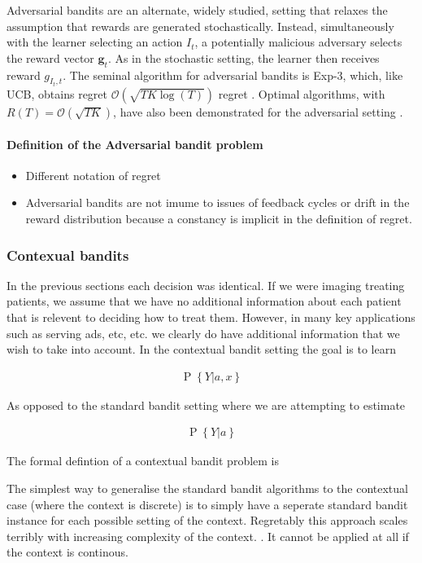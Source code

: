 \documentclass[11pt,a4paper,oneside]{book}
\newcommand{\eq}[1]{\begin{align*}#1\end{align*}}
\newcommand{\bigo}[1]{\mathcal{O}\left( #1 \right)}
\renewcommand{\P}[1]{\operatorname{P}\left\{#1\right\}}
\begin{document}
Adversarial bandits are an alternate, widely studied, setting that relaxes the assumption that rewards are generated stochastically. Instead, simultaneously with the learner selecting an action $I_t$, a potentially malicious adversary selects the reward vector $\boldsymbol{g}_t$. As in the stochastic setting, the learner then receives reward $g_{I_t,t}$. The seminal algorithm for adversarial bandits is Exp-3, which, like UCB, obtains regret $\bigo{\sqrt{TK\log(T)}}$ regret \cite{Auer1995}. Optimal algorithms, with $R(T) = \bigo{\sqrt{TK}}$, have also been demonstrated for the adversarial setting \cite{Audibert2009}.

\paragraph*{Definition of the Adversarial bandit problem}
\begin{itemize}
\item Different notation of regret
\item Adversarial bandits are not imume to issues of feedback cycles or drift in the reward distribution because a constancy is implicit in the definition of regret. 
\end{itemize}

\subsubsection*{Contexual bandits}
In the previous sections each decision was identical. If we were imaging treating patients, we assume that we have no additional information about each patient that is relevent to deciding how to treat them. However, in many key applications such as serving ads, etc, etc. we clearly do have additional information that we wish to take into account. In the contextual bandit setting the goal is to learn 

\eq {
\P{Y|a,x}
} 

As opposed to the standard bandit setting where we are attempting to estimate 

\eq{
\P{Y|a}
}

The formal defintion of a contextual bandit problem is

The simplest way to generalise the standard bandit algorithms to the contextual case (where the context is discrete) is to simply have a seperate standard bandit instance for each possible setting of the context. Regretably this approach scales terribly with increasing complexity of the context. . It cannot be applied at all if the context is continous. 
\end{document}
